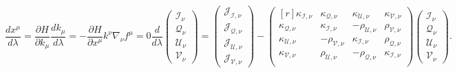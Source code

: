 \begin{appendices}
\begin{subequations}
	\begin{equation}
		\frac{dx^\mu}{d\lambda} = \frac{\partial H}{\partial k_\mu}
	\end{equation}
	\begin{equation}
		\frac{d k_\mu}{d\lambda} = - \frac{\partial H}{\partial x^\mu}
	\end{equation}
	\begin{equation}
		k^\nu\nabla_\nu f^\mu = 0
	\end{equation}
	\begin{equation}
		\frac{d}{d\lambda} \begin{pmatrix}
			\mathcal{I}_\nu\\
			\mathcal{Q}_\nu\\
			\mathcal{U}_\nu\\
			\mathcal{V}_\nu
		\end{pmatrix} = 
		\begin{pmatrix}
			\mathcal{J}_\mathcal{I,\nu}\\
			\mathcal{J}_\mathcal{Q,\nu}\\
			\mathcal{J}_\mathcal{U,\nu}\\
			\mathcal{J}_\mathcal{V,\nu}
		\end{pmatrix}
		-	\begin{pmatrix*}[r]
			\kappa_\mathcal{I,\nu} & \kappa_\mathcal{Q,\nu} & \kappa_\mathcal{U,\nu} & \kappa_\mathcal{V,\nu}\\
			\kappa_\mathcal{Q,\nu}& \kappa_\mathcal{I,\nu}& -\rho_\mathcal{U,\nu}& \rho_\mathcal{V,\nu}\\     	
			\kappa_\mathcal{U,\nu}& -\rho_\mathcal{V,\nu}& \kappa_\mathcal{I,\nu}& \rho_\mathcal{Q,\nu}\\	  
			\kappa_\mathcal{V,\nu}& \rho_\mathcal{U,\nu}& -\rho_\mathcal{Q,\nu}& \kappa_\mathcal{I,\nu}\\
		\end{pmatrix*}
		\begin{pmatrix}
			\mathcal{I}_\nu\\
			\mathcal{Q}_\nu\\
			\mathcal{U}_\nu\\
			\mathcal{V}_\nu
		\end{pmatrix}.
	\end{equation}
\end{subequations}


\end{appendices}
